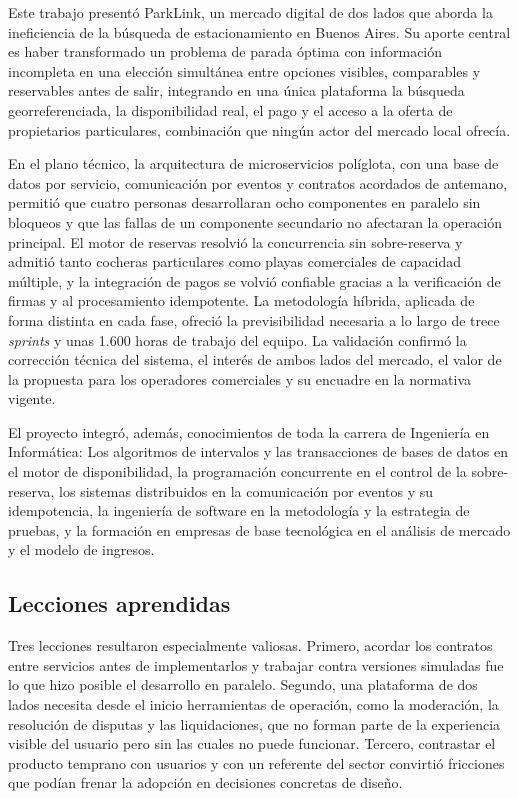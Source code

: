 \documentclass[conference,a4paper]{IEEEtran}
\begin{document}
Este trabajo presentó ParkLink, un mercado digital de dos lados que aborda la ineficiencia de la búsqueda de estacionamiento en Buenos Aires. Su aporte central es haber transformado un problema de parada óptima con información incompleta en una elección simultánea entre opciones visibles, comparables y reservables antes de salir, integrando en una única plataforma la búsqueda georreferenciada, la disponibilidad real, el pago y el acceso a la oferta de propietarios particulares, combinación que ningún actor del mercado local ofrecía.

En el plano técnico, la arquitectura de microservicios políglota, con una base de datos por servicio, comunicación por eventos y contratos acordados de antemano, permitió que cuatro personas desarrollaran ocho componentes en paralelo sin bloqueos y que las fallas de un componente secundario no afectaran la operación principal. El motor de reservas resolvió la concurrencia sin sobre-reserva y admitió tanto cocheras particulares como playas comerciales de capacidad múltiple, y la integración de pagos se volvió confiable gracias a la verificación de firmas y al procesamiento idempotente. La metodología híbrida, aplicada de forma distinta en cada fase, ofreció la previsibilidad necesaria a lo largo de trece \textit{sprints} y unas 1.600 horas de trabajo del equipo. La validación confirmó la corrección técnica del sistema, el interés de ambos lados del mercado, el valor de la propuesta para los operadores comerciales y su encuadre en la normativa vigente.

El proyecto integró, además, conocimientos de toda la carrera de Ingeniería en Informática: Los algoritmos de intervalos y las transacciones de bases de datos en el motor de disponibilidad, la programación concurrente en el control de la sobre-reserva, los sistemas distribuidos en la comunicación por eventos y su idempotencia, la ingeniería de software en la metodología y la estrategia de pruebas, y la formación en empresas de base tecnológica en el análisis de mercado y el modelo de ingresos.

\subsection{Lecciones aprendidas}

Tres lecciones resultaron especialmente valiosas. Primero, acordar los contratos entre servicios antes de implementarlos y trabajar contra versiones simuladas fue lo que hizo posible el desarrollo en paralelo. Segundo, una plataforma de dos lados necesita desde el inicio herramientas de operación, como la moderación, la resolución de disputas y las liquidaciones, que no forman parte de la experiencia visible del usuario pero sin las cuales no puede funcionar. Tercero, contrastar el producto temprano con usuarios y con un referente del sector convirtió fricciones que podían frenar la adopción en decisiones concretas de diseño.
\end{document}
